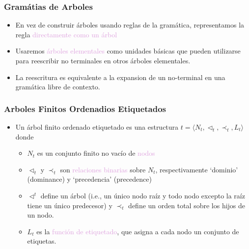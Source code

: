 \documentclass[compress,color=usenames]{beamer}
\newcommand{\mH}[1]{\textcolor{Plum}{#1}}
\newcommand{\tup}[1]{\langle #1 \rangle}
\begin{document}
\begin{frame}
\frametitle{Gram\'atias de Arboles}

\begin{itemize}

\item En vez de construir \'arboles usando reglas de la gram\'atica, representamos
la regla \mH{directamente como un \'arbol}

\item Usaremos \mH{\'arboles elementales} como unidades b\'asicas que pueden utilizarse
para reescribir no terminales en otros \'arboles elementales.

\item La reescritura es equivalente a la expansion de un no-terminal en una 
gram\'atica libre de contexto.  

\end{itemize}

\end{frame}

\begin{frame}
\frametitle{Arboles Finitos Ordenadios Etiquetados}

\begin{itemize}
\item Un \'arbol finito ordenado etiquetado es una estructura $t = \tup{N_t, \triangleleft_t, \prec_t, L_t}$ 
donde\pause

\begin{itemize}
\item $N_t$ es un conjunto finito no vac\'io de \mH{nodos} \pause

\item $\triangleleft_t$ y $\prec_t$ son \mH{relaciones binarias} sobre $N_t$, respectivamente `dominio' (dominance) y `precedencia' (precedence) \pause

\item $\triangleleft^t$ define un \'arbol (i.e., un \'unico nodo ra\'iz y todo nodo excepto la ra\'iz tiene un \'unico predecesor) y $\prec_t$ define un orden total sobre los hijos de un nodo. \pause

\item $L_t$ es la \mH{funci\'on de etiquetado}, que asigna a cada nodo un conjunto de etiquetas.  
\end{itemize}
\end{itemize}
\end{frame}
\end{document}
